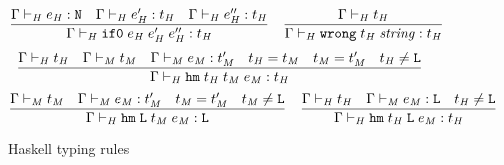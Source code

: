 \begin{figure}[p]
\[\]
\[
\frac
{\Gamma \vdash_{\mathit{H}} e_{\mathit{H}} : \mathtt{N} \quad \Gamma \vdash_{\mathit{H}} e_{\mathit{H}}' : t_{\mathit{H}} \quad \Gamma \vdash_{\mathit{H}} e_{\mathit{H}}'' : t_{\mathit{H}}}
{\Gamma \vdash_{\mathit{H}} \mathtt{if0} \; e_{\mathit{H}} \; e_{\mathit{H}}' \; e_{\mathit{H}}'' : t_{\mathit{H}}}
\quad
\frac
{\Gamma \vdash_{\mathit{H}} t_{\mathit{H}}}
{\Gamma \vdash_{\mathit{H}} \mathtt{wrong} \; t_{\mathit{H}} \; \mathit{string} : t_{\mathit{H}}}
\]
\[
\frac
{\Gamma \vdash_{\mathit{H}} t_{\mathit{H}} \quad \Gamma \vdash_{\mathit{M}} t_{\mathit{M}} \quad \Gamma \vdash_{\mathit{M}} e_{\mathit{M}} : t_{\mathit{M}}' \quad t_{\mathit{H}}=t_{\mathit{M}} \quad t_{\mathit{M}} = t_{\mathit{M}}' \quad t_{\mathit{H}} \neq \mathtt{L}}
{\Gamma \vdash_{\mathit{H}} \mathtt{hm} \; t_{\mathit{H}} \; t_{\mathit{M}} \; e_{\mathit{M}} : t_{\mathit{H}}}
\]
\[
\frac
{\Gamma \vdash_{\mathit{M}} t_{\mathit{M}} \quad \Gamma \vdash_{\mathit{M}} e_{\mathit{M}} : t_{\mathit{M}}' \quad t_{\mathit{M}} = t_{\mathit{M}}' \quad t_{\mathit{M}} \neq \mathtt{L}}
{\Gamma \vdash_{\mathit{H}} \mathtt{hm} \; \mathtt{L} \; t_{\mathit{M}} \; e_{\mathit{M}} : \mathtt{L}}
\quad
\frac
{\Gamma \vdash_{\mathit{H}} t_{\mathit{H}} \quad \Gamma \vdash_{\mathit{M}} e_{\mathit{M}} : \mathtt{L} \quad t_{\mathit{H}} \neq \mathtt{L}}
{\Gamma \vdash_{\mathit{H}} \mathtt{hm} \; t_{\mathit{H}} \; \mathtt{L} \; e_{\mathit{M}} : t_{\mathit{H}}}
\]
\caption{Haskell typing rules}
\label{htr}
\end{figure}
